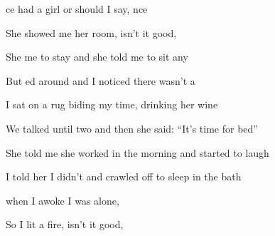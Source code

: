 
\zs
{}ce had a girl or should I say, nce  

She showed me her room, isn't it good,  

She  me to stay and she told me to sit any

But ed around and I noticed there wasn't a  
\ks

\zs
I sat on a rug biding my time, drinking her wine

We talked until two and then she said: ``It's time for bed''

She told me she worked in the morning and started to laugh

I told her I didn't and crawled off to sleep in the bath
\ks

\zr
{} when I awoke I was alone,   

So I lit a fire, isn't it good,  
\kr

\kp





